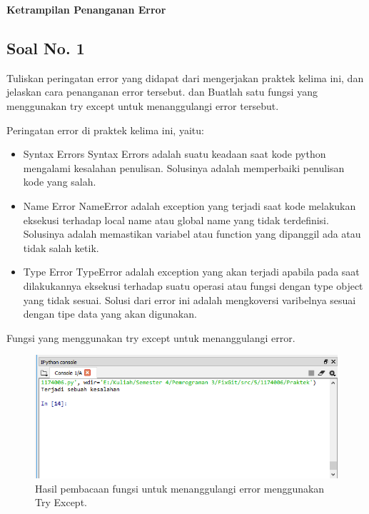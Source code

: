 \hfill \break
{\Large \textbf{Ketrampilan Penanganan Error}}

\subsection{Soal No. 1}
Tuliskan  peringatan  error  yang  didapat  dari  mengerjakan  praktek  kelima  ini, dan  jelaskan  cara  penanganan  error  tersebut.   dan  Buatlah  satu  fungsi  yang menggunakan try except untuk menanggulangi error tersebut.

\hfill \break
Peringatan error di praktek kelima ini, yaitu:
\begin{itemize}
	\item Syntax Errors
	Syntax Errors adalah suatu keadaan saat kode python mengalami kesalahan penulisan. Solusinya adalah memperbaiki penulisan kode yang salah.
	
	\item Name Error
	NameError adalah exception yang terjadi saat kode melakukan eksekusi terhadap local name atau global name yang tidak terdefinisi. Solusinya adalah memastikan variabel atau function yang dipanggil ada atau tidak salah ketik.
	
	\item Type Error
	TypeError adalah exception yang akan terjadi apabila pada saat dilakukannya eksekusi terhadap suatu operasi atau fungsi dengan type object yang tidak sesuai. Solusi dari error ini adalah mengkoversi varibelnya sesuai dengan tipe data yang akan digunakan.
\end{itemize}

\hfill \break
Fungsi yang menggunakan try except untuk menanggulangi error.



\begin{figure}[H]
	\includegraphics[width=12cm]{figures/5/1174026/Praktek/5.png}
	\centering
	\caption{Hasil pembacaan fungsi untuk menanggulangi error menggunakan Try Except.}
\end{figure}

